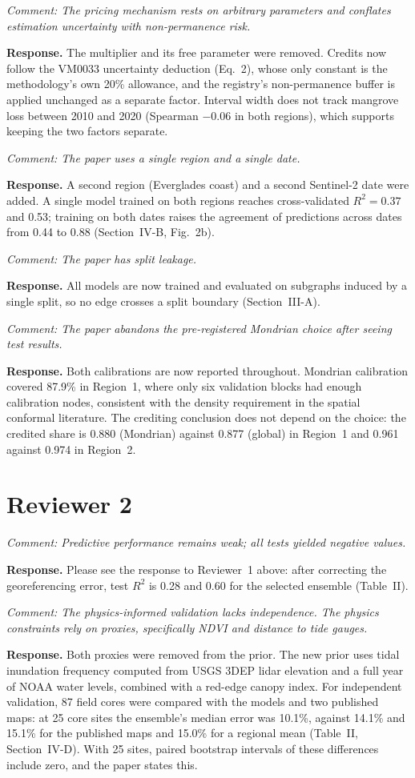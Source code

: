 \documentclass[10pt]{article}
\newcommand{\rc}[1]{\par\textit{Comment: #1}\par}
\newcommand{\resp}{\textbf{Response.} }
\begin{document}
\rc{The pricing mechanism rests on arbitrary parameters and conflates estimation uncertainty with non-permanence risk.}
\resp The multiplier and its free parameter were removed. Credits now follow the VM0033 uncertainty deduction (Eq.~2), whose only constant is the methodology's own 20\% allowance, and the registry's non-permanence buffer is applied unchanged as a separate factor. Interval width does not track mangrove loss between 2010 and 2020 (Spearman $-0.06$ in both regions), which supports keeping the two factors separate.

\rc{The paper uses a single region and a single date.}
\resp A second region (Everglades coast) and a second Sentinel-2 date were added. A single model trained on both regions reaches cross-validated $R^2=0.37$ and 0.53; training on both dates raises the agreement of predictions across dates from 0.44 to 0.88 (Section~IV-B, Fig.~2b).

\rc{The paper has split leakage.}
\resp All models are now trained and evaluated on subgraphs induced by a single split, so no edge crosses a split boundary (Section~III-A).

\rc{The paper abandons the pre-registered Mondrian choice after seeing test results.}
\resp Both calibrations are now reported throughout. Mondrian calibration covered 87.9\% in Region~1, where only six validation blocks had enough calibration nodes, consistent with the density requirement in the spatial conformal literature. The crediting conclusion does not depend on the choice: the credited share is 0.880 (Mondrian) against 0.877 (global) in Region~1 and 0.961 against 0.974 in Region~2.

\section*{Reviewer 2}

\rc{Predictive performance remains weak; all tests yielded negative values.}
\resp Please see the response to Reviewer~1 above: after correcting the georeferencing error, test $R^2$ is 0.28 and 0.60 for the selected ensemble (Table~II).

\rc{The physics-informed validation lacks independence. The physics constraints rely on proxies, specifically NDVI and distance to tide gauges.}
\resp Both proxies were removed from the prior. The new prior uses tidal inundation frequency computed from USGS 3DEP lidar elevation and a full year of NOAA water levels, combined with a red-edge canopy index. For independent validation, 87 field cores were compared with the models and two published maps: at 25 core sites the ensemble's median error was 10.1\%, against 14.1\% and 15.1\% for the published maps and 15.0\% for a regional mean (Table~II, Section~IV-D). With 25 sites, paired bootstrap intervals of these differences include zero, and the paper states this.
\end{document}
